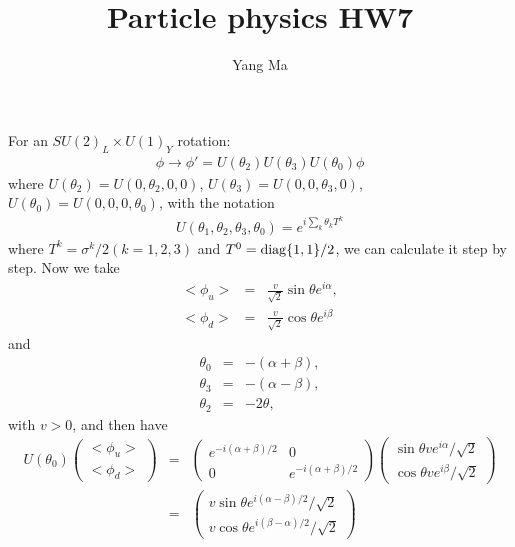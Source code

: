 \documentclass[11pt]{article}
\begin{document}
\title{Particle physics HW7}
\author{Yang Ma}

\maketitle

\section{ }
For an $SU(2)_L \times U(1)_Y$ rotation:
  \begin{eqnarray}
    \phi \to \phi' = U(\theta_2) U(\theta_3) U(\theta_0) \phi \label{eq.721ro}
  \end{eqnarray}
   where $U(\theta_2) = U(0,\theta_2,0,0)$, $U(\theta_3) = U(0,0,\theta_3,0)$, $U(\theta_0) = U(0,0,0,\theta_0)$, with the notation
\begin{eqnarray}
  U(\theta_1,\theta_2,\theta_3,\theta_0)
  = e^{ i \sum_k \theta_k T^k }
\end{eqnarray}
 where $T^k = \sigma^k/2 (k=1,2,3)$ and $T^0 = {\rm diag}\{1,1\}/2$, we can calculate it step by step.
 Now we take
 \begin{eqnarray}
    <\phi_u> &=& \frac{v}{\sqrt 2} \sin\theta e^{i\alpha}, \\
    <\phi_d> &=& \frac{v}{\sqrt 2} \cos\theta e^{i\beta} 
  \end{eqnarray}
     and 
  \begin{eqnarray}
    \theta_0 &=& -(\alpha+\beta), \\
    \theta_3 &=& -(\alpha-\beta), \\
    \theta_2 &=& -2\theta,
  \end{eqnarray}
  with $v>0$, and then have 
\begin{eqnarray}
    U(\theta_0)
    \begin{pmatrix}
      <\phi_u> \\ <\phi_d>
    \end{pmatrix}&=&
    \begin{pmatrix}
      e^{-i(\alpha+\beta)/2} & 0 \\0 &   e^{-i(\alpha+\beta)/2} 
    \end{pmatrix}
    \begin{pmatrix}
        \sin\theta v e^{i \alpha}/\sqrt 2 \\ \cos\theta v e^{i \beta}/\sqrt 2 
    \end{pmatrix} \\
      &=&
      \begin{pmatrix}
        v \sin\theta e^{i(\alpha-\beta)/2} /\sqrt 2 \\
        v \cos\theta e^{i(\beta-\alpha)/2} /\sqrt 2
      \end{pmatrix}
\end{eqnarray}
\end{document}
